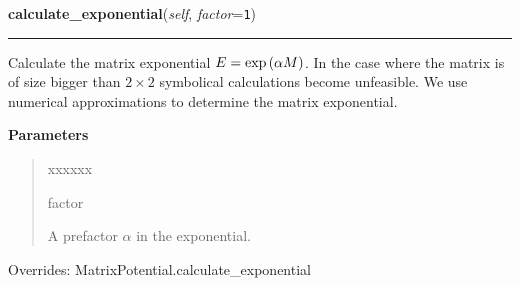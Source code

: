     \vspace{0.5ex}

\hspace{.8\funcindent}\begin{boxedminipage}{\funcwidth}

    \raggedright \textbf{calculate\_exponential}(\textit{self}, \textit{factor}={\tt 1})

    \vspace{-1.5ex}

    \rule{\textwidth}{0.5\fboxrule}
\setlength{\parskip}{2ex}
    Calculate the matrix exponential $E =
    \exp\left( \alpha M \right)$. In the case where
    the matrix is of size bigger than $2 \times 2$ symbolical
    calculations become unfeasible. We use numerical approximations to
    determine the matrix exponential.

\setlength{\parskip}{1ex}
      \textbf{Parameters}
      \vspace{-1ex}

      \begin{quote}
        \begin{Ventry}{xxxxxx}

          \item[factor]

          A prefactor $\alpha$ in the exponential.

        \end{Ventry}

      \end{quote}



      Overrides: MatrixPotential.calculate\_exponential

    \end{boxedminipage}

    \vspace{0.5ex}

